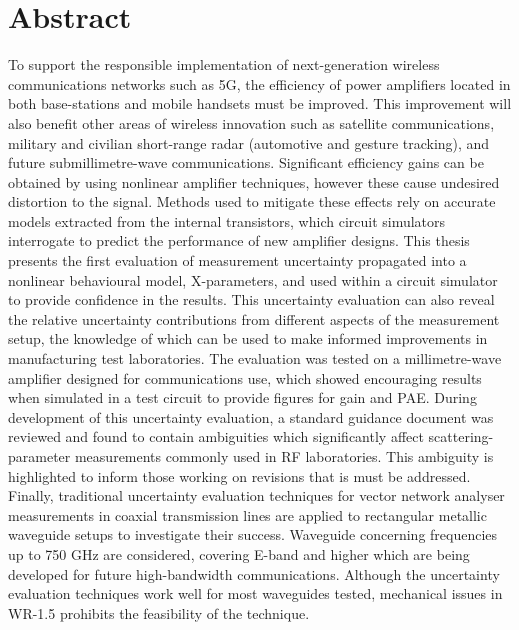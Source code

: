 \documentclass[../thesis/thesis.tex]{subfiles}
\begin{document}
\chapter*{Abstract}
\renewcommand{\baselinestretch}{1.5}\selectfont
To support the responsible implementation of next-generation wireless communications networks such as 5G, the efficiency of power amplifiers located in both base-stations and mobile handsets must be improved. This improvement will also benefit other areas of wireless innovation such as satellite communications, military and civilian short-range radar (automotive and gesture tracking), and future submillimetre-wave communications. Significant efficiency gains can be obtained by using nonlinear amplifier techniques, however these cause undesired distortion to the signal. Methods used to mitigate these effects rely on accurate models extracted from the internal transistors, which circuit simulators interrogate to predict the performance of new amplifier designs. This thesis presents the first evaluation of measurement uncertainty propagated into a nonlinear behavioural model, X-parameters, and used within a circuit simulator to provide confidence in the results. This uncertainty evaluation can also reveal the relative uncertainty contributions from different aspects of the measurement setup, the knowledge of which can be used to make informed improvements in manufacturing test laboratories. The evaluation was tested on a millimetre-wave amplifier designed for communications use, which showed encouraging results when simulated in a test circuit to provide figures for gain and PAE. During development of this uncertainty evaluation, a standard guidance document was reviewed and found to contain ambiguities which significantly affect scattering-parameter measurements commonly used in RF laboratories. This ambiguity is highlighted to inform those working on revisions that is must be addressed. Finally, traditional uncertainty evaluation techniques for vector network analyser measurements in coaxial transmission lines are applied to rectangular metallic waveguide setups to investigate their success. Waveguide concerning frequencies up to 750 GHz are considered, covering E-band and higher which are being developed for future high-bandwidth communications. Although the uncertainty evaluation techniques work well for most waveguides tested, mechanical issues in WR-1.5 prohibits the feasibility of the technique.

\renewcommand{\baselinestretch}{1}\selectfont
\end{document}
